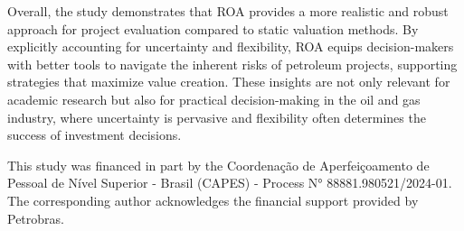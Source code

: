 \documentclass[pdflatex,sn-basic]{sn-jnl}%
\theoremstyle{thmstyleone}%
\theoremstyle{thmstyletwo}%
\theoremstyle{thmstylethree}%
\begin{document}
Overall, the study demonstrates that ROA provides a more realistic and robust approach for project evaluation compared to static valuation methods. By explicitly accounting for uncertainty and flexibility, ROA equips decision-makers with better tools to navigate the inherent risks of petroleum projects, supporting strategies that maximize value creation. These insights are not only relevant for academic research but also for practical decision-making in the oil and gas industry, where uncertainty is pervasive and flexibility often determines the success of investment decisions.

This study was financed in part by the Coordenação de Aperfeiçoamento de Pessoal de Nível Superior - Brasil (CAPES) - Process N° 88881.980521/2024-01. The corresponding author acknowledges the financial support provided by Petrobras.





\newpage
\end{document}
